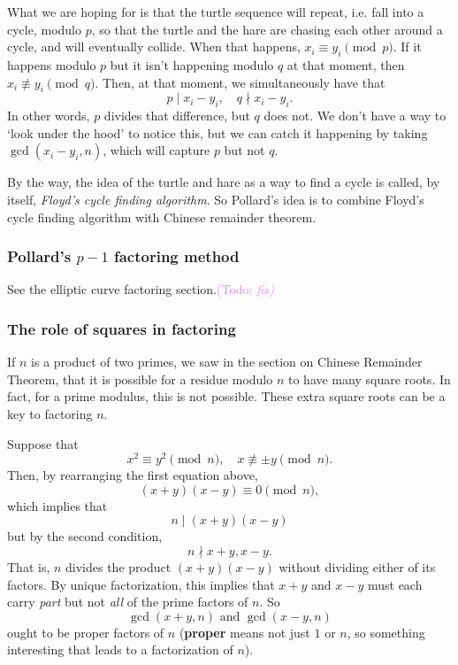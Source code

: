 \documentclass{article}
\theoremstyle{plain}
\theoremstyle{definition}
\theoremstyle{remark}
\numberwithin{theorem}{section}
\newcommand{\KS}[1]{\textcolor{violet}{{\sf (Todo:} {\sl{#1})}}}
\newcommand{\KS}[1]{}
\begin{document}
What we are hoping for is that the turtle sequence will repeat, i.e. fall into a cycle, modulo $p$, so that the turtle and the hare are chasing each other around a cycle, and will eventually collide.  When that happens, $x_i \equiv y_i \pmod p$.  If it happens modulo $p$ but it isn't happening modulo $q$ at that moment, then $x_i \not\equiv y_i \pmod q$.  Then, at that moment, we simultaneously have that
\[
p \mid x_i - y_i, \quad q \nmid x_i - y_i.
\]
In other words, $p$ divides that difference, but $q$ does not.  We don't have a way to `look under the hood' to notice this, but we can catch it happening by taking $\gcd(x_i-y_i,n)$, which will capture $p$ but not $q$.

By the way, the idea of the turtle and hare as a way to find a cycle is called, by itself, \emph{Floyd's cycle finding algorithm}.  So Pollard's idea is to combine Floyd's cycle finding algorithm with Chinese remainder theorem.

\subsubsection{Pollard's $p-1$ factoring method}

See the elliptic curve factoring section.\KS{fix}

\subsubsection{The role of squares in factoring}
\label{sec:surprise-square}

If $n$ is a product of two primes, we saw in the section on Chinese Remainder Theorem, that it is possible for a residue modulo $n$ to have many square roots.  In fact, for a prime modulus, this is not possible.  These extra square roots can be a key to factoring $n$.

Suppose that
\[
x^2 \equiv y^2 \pmod{n}, \quad x \not\equiv \pm y \pmod{n}.
\]
Then, by rearranging the first equation above,
\[
(x+y)(x-y) \equiv 0 \pmod{n},
\]
which implies that 
\[
n \mid (x+y)(x-y)
\]
but by the second condition,
\[
n \nmid x+y, x-y.
\]
That is, $n$ divides the product $(x+y)(x-y)$ without dividing either of its factors.  By unique factorization, this implies that $x+y$ and $x-y$ must each carry \emph{part} but not \emph{all} of the prime factors of $n$.  So
\[
\gcd(x+y,n) \text{  and  } \gcd(x-y,n)
\]
ought to be proper factors of $n$ (\textbf{proper} means not just $1$ or $n$, so something interesting that leads to a factorization of $n$).
\end{document}
